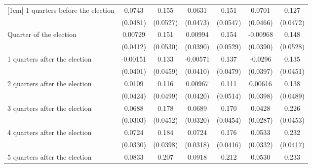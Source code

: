\begin{table}[htbp]
\begin{tabular}{l*{6}{c}}
[1em]
 1 quarters before the election&      0.0743         &       0.155\sym{**} &      0.0631         &       0.151\sym{**} &      0.0701         &       0.127\sym{**} \\
                    &    (0.0481)         &    (0.0527)         &    (0.0473)         &    (0.0547)         &    (0.0466)         &    (0.0472)         \\
[1em]
Quarter of the election&     0.00729         &       0.151\sym{**} &     0.00994         &       0.154\sym{**} &    -0.00968         &       0.148\sym{**} \\
                    &    (0.0412)         &    (0.0530)         &    (0.0390)         &    (0.0529)         &    (0.0390)         &    (0.0528)         \\
[1em]
 1 quarters after the election&    -0.00151         &       0.133\sym{**} &    -0.00571         &       0.137\sym{**} &     -0.0296         &       0.135\sym{**} \\
                    &    (0.0401)         &    (0.0459)         &    (0.0410)         &    (0.0479)         &    (0.0397)         &    (0.0451)         \\
[1em]
 2 quarters after the election&      0.0109         &       0.116\sym{*}  &     0.00967         &       0.111\sym{*}  &     0.00616         &       0.138\sym{**} \\
                    &    (0.0424)         &    (0.0499)         &    (0.0420)         &    (0.0514)         &    (0.0398)         &    (0.0489)         \\
[1em]
 3 quarters after the election&      0.0688\sym{*}  &       0.178\sym{***}&      0.0689\sym{*}  &       0.170\sym{***}&      0.0428         &       0.226\sym{***}\\
                    &    (0.0303)         &    (0.0452)         &    (0.0320)         &    (0.0454)         &    (0.0287)         &    (0.0453)         \\
[1em]
 4 quarters after the election&      0.0724\sym{*}  &       0.184\sym{***}&      0.0724\sym{*}  &       0.176\sym{***}&      0.0533         &       0.232\sym{***}\\
                    &    (0.0330)         &    (0.0398)         &    (0.0318)         &    (0.0416)         &    (0.0332)         &    (0.0417)         \\
[1em]
 5 quarters after the election&      0.0833\sym{*}  &       0.207\sym{***}&      0.0918\sym{*}  &       0.212\sym{***}&      0.0530         &       0.233\sym{***}\\

\end{tabular}
\end{table}
